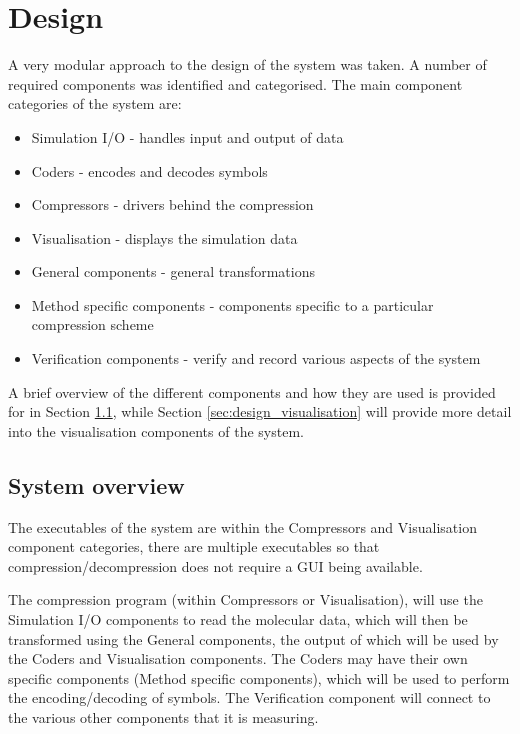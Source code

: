\graphicspath{{./design/}}

\chapter{Design}
\label{cha:Design}


A very modular approach to the design of the system was taken. A number of
required components was identified and categorised. The main component
categories of the system are:

\begin{itemize}
  \item Simulation I/O - handles input and output of data
  \item Coders - encodes and decodes symbols
  \item Compressors - drivers behind the compression
  \item Visualisation - displays the simulation data
  \item General components - general transformations
  \item Method specific components - components specific to a particular
  compression scheme
  \item Verification components - verify and record various aspects of the
  system
\end{itemize}

A brief overview of the different components and how they are used is provided
for in Section \ref{sec:design_overview}, while Section
\ref{sec:design_visualisation} will provide more detail into the
visualisation components of the system.


\section{System overview}
\label{sec:design_overview}

The executables of the system are within the Compressors and Visualisation
component categories, there are multiple executables so that
compression/decompression does not require a GUI being available.

The compression program (within Compressors or Visualisation), will use the
Simulation I/O components to read the molecular data, which will then be
transformed using the General components, the output of which will be used by
the Coders and Visualisation components. The Coders may have their own specific
components (Method specific components), which will be used to perform the
encoding/decoding of symbols. The Verification component will connect to the
various other components that it is measuring.

